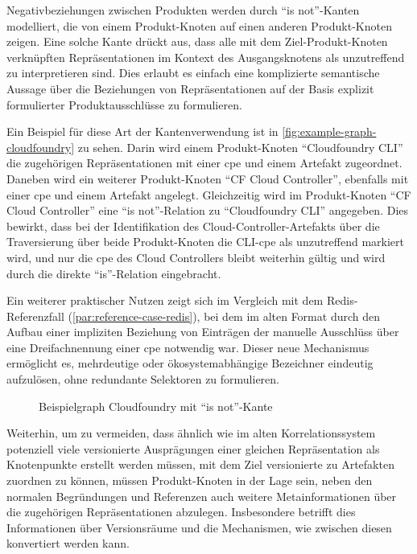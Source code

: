 Negativbeziehungen zwischen Produkten werden durch \enquote{is not}-Kanten modelliert, die von einem Produkt-Knoten auf einen anderen Produkt-Knoten zeigen.
Eine solche Kante drückt aus, dass alle mit dem Ziel-Produkt-Knoten verknüpften Repräsentationen im Kontext des Ausgangsknotens als unzutreffend zu interpretieren sind.
Dies erlaubt es einfach eine komplizierte semantische Aussage über die Beziehungen von Repräsentationen auf der Basis explizit formulierter Produktausschlüsse zu formulieren.

Ein Beispiel für diese Art der Kantenverwendung ist in \autoref{fig:example-graph-cloudfoundry} zu sehen.
Darin wird einem Produkt-Knoten \enquote{Cloudfoundry CLI} die zugehörigen Repräsentationen mit einer \acrshort{cpe} und einem Artefakt zugeordnet.
Daneben wird ein weiterer Produkt-Knoten \enquote{CF Cloud Controller}, ebenfalls mit einer \acrshort{cpe} und einem Artefakt angelegt.
Gleichzeitig wird im Produkt-Knoten \enquote{CF Cloud Controller} eine \enquote{is not}-Relation zu \enquote{Cloudfoundry CLI} angegeben.
Dies bewirkt, dass bei der Identifikation des Cloud-Controller-Artefakts über die Traversierung über beide Produkt-Knoten die CLI-\acrshort{cpe} als unzutreffend markiert wird, und nur die \acrshort{cpe} des Cloud Controllers bleibt weiterhin gültig und wird durch die direkte \enquote{is}-Relation eingebracht.

Ein weiterer praktischer Nutzen zeigt sich im Vergleich mit dem Redis-Referenzfall (\autoref{par:reference-case-redis}), bei dem im alten Format durch den Aufbau einer impliziten Beziehung von Einträgen der manuelle Ausschlüss über eine Dreifachnennung einer \acrshort{cpe} notwendig war.
Dieser neue Mechanismus ermöglicht es, mehrdeutige oder ökosystemabhängige Bezeichner eindeutig aufzulösen, ohne redundante Selektoren zu formulieren.

\begin{figure}[htbp]
    \centering
    \makebox[\textwidth]{}
    \caption{Beispielgraph Cloudfoundry mit \enquote{is not}-Kante}
    \label{fig:example-graph-cloudfoundry}
\end{figure}

Weiterhin, um zu vermeiden, dass ähnlich wie im alten Korrelationssystem potenziell viele versionierte Ausprägungen einer gleichen Repräsentation als Knotenpunkte erstellt werden müssen, mit dem Ziel versionierte  zu Artefakten zuordnen zu können, müssen Produkt-Knoten in der Lage sein, neben den normalen Begründungen und Referenzen auch weitere Metainformationen über die zugehörigen Repräsentationen abzulegen.
Insbesondere betrifft dies Informationen über Versionsräume und die Mechanismen, wie zwischen diesen konvertiert werden kann.

